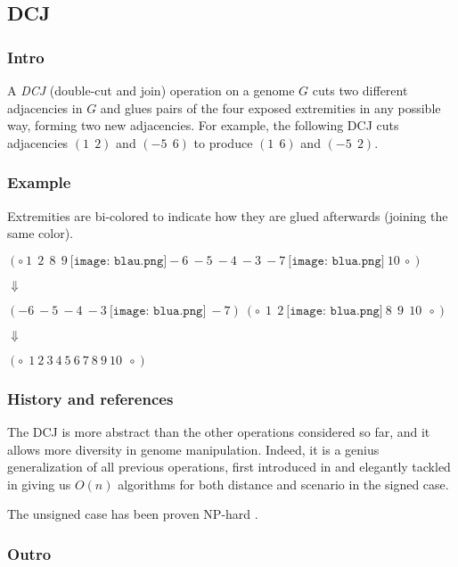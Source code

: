 \documentclass[11pt,final,twoside,nofrench]{thlifl}
\begin{document}
\subsection{DCJ}

\subsubsection*{Intro}

A \emph{DCJ} (double-cut and join) operation on a genome $G$ cuts two different adjacencies in $G$ and glues pairs of the four exposed extremities in any possible way, forming two 
new adjacencies.
For example, the following DCJ cuts adjacencies $(1~~2)$ and $({-5}~~6)$ to produce $(1~~6)$ 
and $({-5}~~2)$.

\subsubsection*{Example}

\begin{center}

Extremities are bi-colored to indicate how they are glued afterwards (joining the same color).

$ (\circ~1~~2~~8~~9~\texttt{[image: blau.png]}-6~-5~-4~-3~-7~\texttt{[image: blua.png]}~10~\circ)$

$\Downarrow$

$ (-6~-5~-4~-3~\texttt{[image: blua.png]}~-7) ~ (\circ~~1~~2~\texttt{[image: blua.png]}~8~~9~~10~~\circ)$

$\Downarrow$

$(\circ~~1~2~3~4~5~6~7~8~9~10~~\circ)$

\end{center}

\subsubsection*{History and references}

The DCJ is more abstract than the other operations considered so far, and it allows more diversity in genome manipulation. Indeed, it is a genius generalization of all previous operations, first introduced in \cite{Yancopoulos05} and elegantly tackled in \cite{BMS06} giving us $O(n)$ algorithms for both distance and scenario in the signed case.

The unsigned case has been proven NP-hard \cite{C10}.

\subsubsection*{Outro}
\end{document}
